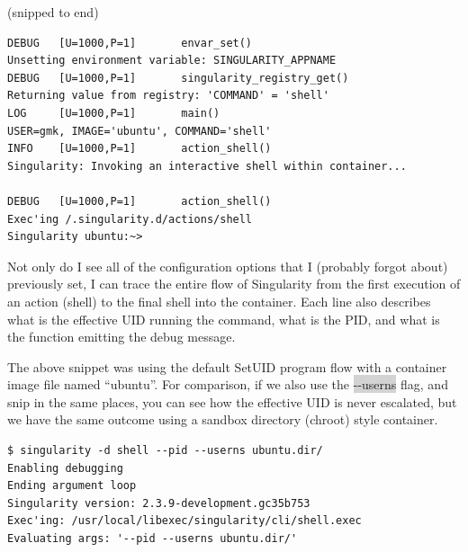\documentclass[a4paper]{article}
\newcounter{subsubsubsection}[subsubsection]
\begin{document}
(snipped to end)

\begin{lstlisting}[frame=single]
DEBUG   [U=1000,P=1]       envar_set()                               Unsetting environment variable: SINGULARITY_APPNAME
DEBUG   [U=1000,P=1]       singularity_registry_get()                Returning value from registry: 'COMMAND' = 'shell'
LOG     [U=1000,P=1]       main()                                    USER=gmk, IMAGE='ubuntu', COMMAND='shell'
INFO    [U=1000,P=1]       action_shell()                            Singularity: Invoking an interactive shell within container...

DEBUG   [U=1000,P=1]       action_shell()                            Exec'ing /.singularity.d/actions/shell
Singularity ubuntu:~> 

\end{lstlisting}


Not only do I see all of the configuration options that I (probably forgot about) previously set, I can trace the entire flow of Singularity from the first execution of an action (shell) to the final shell into the container. Each line also describes what is the effective UID running the command, what is the PID, and what is the function emitting the debug message.


The above snippet was using the default SetUID program flow with a container image file named “ubuntu”. For comparison, if we also use the \colorbox{lightgray}{-{}-userns} flag, and snip in the same places, you can see how the effective UID is never escalated, but we have the same outcome using a sandbox directory (chroot) style container.

\begin{lstlisting}[frame=single]
$ singularity -d shell --pid --userns ubuntu.dir/
Enabling debugging
Ending argument loop
Singularity version: 2.3.9-development.gc35b753
Exec'ing: /usr/local/libexec/singularity/cli/shell.exec
Evaluating args: '--pid --userns ubuntu.dir/'
\end{lstlisting}
\end{document}
